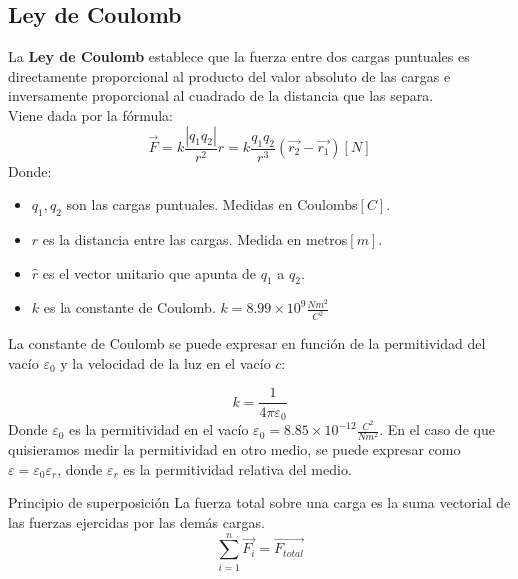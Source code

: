 \subsection{Ley de Coulomb}
La \textbf{Ley de Coulomb} establece que la fuerza entre dos cargas puntuales es directamente proporcional al producto del valor absoluto de las cargas e inversamente proporcional al cuadrado de la distancia que las separa.\\
Viene dada por la fórmula:
\begin{equation}
    \vec{F} = k \frac{|q_1 q_2|}{r^2} \hat{r} = k \frac{q_1 q_2}{r^3} (\vec{r_2} - \vec{r_1}) [N]
\end{equation}
Donde: 
\begin{itemize}
    \item $q_1, q_2$ son las cargas puntuales. Medidas en Coulombs$[C]$.
    \item $r$ es la distancia entre las cargas. Medida en metros$[m]$.
    \item $\hat{r}$ es el vector unitario que apunta de $q_1$ a $q_2$.
    \item $k$ es la constante de Coulomb. $k = 8.99 \times 10^9 \frac{Nm^2}{C^2}$
\end{itemize}

\noindent
La constante de Coulomb se puede expresar en función de la permitividad del vacío $\varepsilon_0$ y la velocidad de la luz en el vacío $c$:

\begin{equation}
    k = \frac{1}{4\pi \varepsilon_0}
\end{equation}
Donde $\varepsilon_0$ es la permitividad en el vacío $\varepsilon_0 = 8.85 \times 10^{-12} \frac{C^2}{Nm^2}$. En el caso de que quisieramos medir la permitividad en otro medio, se puede expresar como $\varepsilon = \varepsilon_0 \varepsilon_r$, donde $\varepsilon_r$ es la permitividad relativa del medio.


\begin{teorema}{Principio de superposición}
    La fuerza total sobre una carga es la suma vectorial de las fuerzas ejercidas por las demás cargas.
    $$\sum_{i=1}^{n} \vec{F_i} = \vec{F_{total}}$$
\end{teorema}

